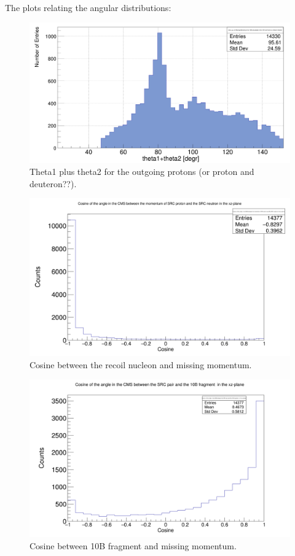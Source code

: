 \documentclass{report}
\begin{document}
The plots relating the angular distributions:\newline
\begin{figure}[!htb]
  \includegraphics[width=\linewidth]{theta1_plus_theta2_src.png}
  \caption{Theta1 plus theta2 for the outgoing protons (or proton and deuteron??).}
\end{figure}
\newline
\begin{figure}[!htb]
  \includegraphics[width=\linewidth]{cos_src_pair.png}
  \caption{Cosine between the recoil nucleon and missing momentum.}
\end{figure}
\newline
\begin{figure}[!htb]
  \includegraphics[width=\linewidth]{cos_src_pair_vs_10B.png}
  \caption{Cosine between 10B fragment and missing momentum.}
\end{figure}
\newline
\newpage
\end{document}
